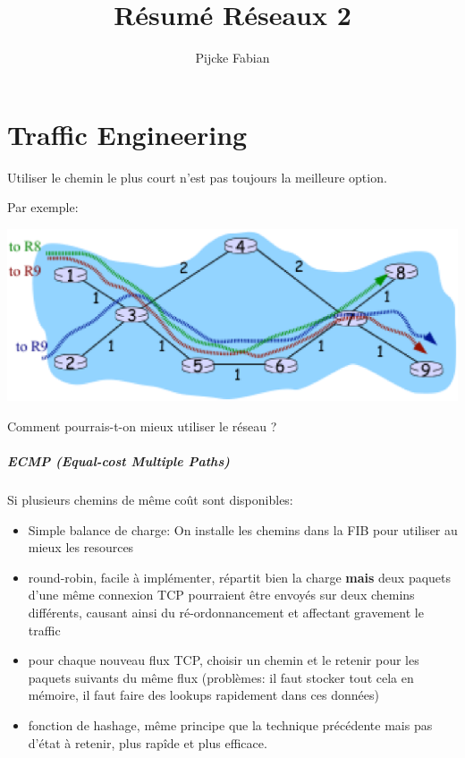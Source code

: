 \documentclass{report}
\title{Résumé Réseaux 2}
\author{Pijcke Fabian}
\begin{document}
\maketitle

\chapter{Traffic Engineering}

Utiliser le chemin le plus court n'est pas toujours la meilleure option.

Par exemple:

\includegraphics[width=\textwidth]{fishnetwork.eps}

Comment pourrais-t-on mieux utiliser le réseau ?

\paragraph{ECMP (Equal-cost Multiple Paths)}

Si plusieurs chemins de même coût sont disponibles:

\begin{itemize}
\item Simple balance de charge: On installe les chemins dans la FIB
  pour utiliser au mieux les resources
\item round-robin, facile à implémenter, répartit bien la charge
  \textbf{mais} deux paquets d'une même connexion TCP pourraient être
  envoyés sur deux chemins différents, causant ainsi du
  ré-ordonnancement et affectant gravement le traffic
\item pour chaque nouveau flux TCP, choisir un chemin et le retenir
  pour les paquets suivants du même flux (problèmes: il faut stocker
  tout cela en mémoire, il faut faire des lookups rapidement dans ces
  données)
\item fonction de hashage, même principe que la technique précédente
  mais pas d'état à retenir, plus rapîde et plus efficace.
\end{itemize}
\end{document}
